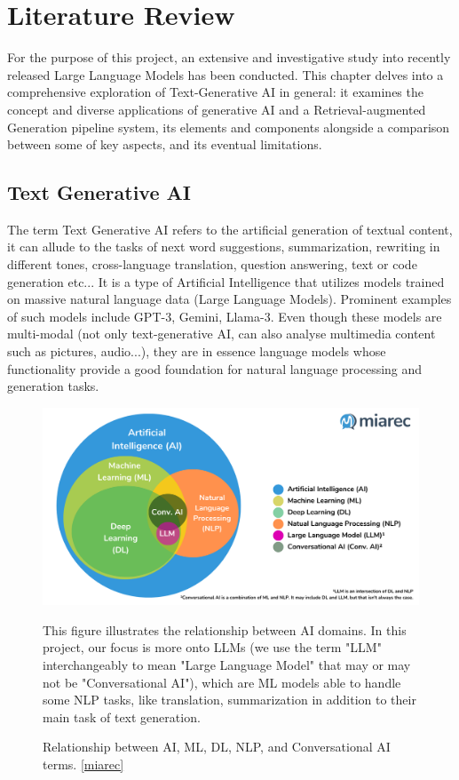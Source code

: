 \chapter{Literature Review}
For the purpose of this project, an extensive and investigative study into recently released Large Language Models has been conducted. This chapter delves into a comprehensive exploration of Text-Generative AI in general: it examines the concept and diverse applications of generative AI and a Retrieval-augmented Generation pipeline system, its elements and components alongside a comparison between some of key aspects, and its eventual limitations.
\newpage

\section{Text Generative AI}
The term Text Generative AI refers to the artificial generation of textual content, it can allude to the tasks of next word suggestions, summarization, rewriting in different tones, cross-language translation, question answering, text or code generation etc...
It is a type of Artificial Intelligence that utilizes models trained on massive natural language data (Large Language Models). Prominent examples of such models include GPT-3, Gemini, Llama-3. Even though these models are multi-modal (not only text-generative AI, can also analyse multimedia content such as pictures, audio...), they are in essence language models whose functionality provide a good foundation for natural language processing and generation tasks.
\begin{figure}[htbp]
    \centering
    \includegraphics[width=.97\linewidth]{./figures/genai-relation-diagram.png}
    \caption{Relationship between AI, ML, DL, NLP, and Conversational AI terms. \href{https://blog.miarec.com/contact-centers-ai-definition}{[miarec]}}
    \begin{flushleft}
        \small This figure illustrates the relationship between AI domains. In this project, our focus is more onto LLMs (we use the term "LLM" interchangeably to mean "Large Language Model" that may or may not be "Conversational AI"), which are ML models able to handle some NLP tasks, like translation, summarization in addition to their main task of text generation.
    \end{flushleft}
\end{figure}\newline
